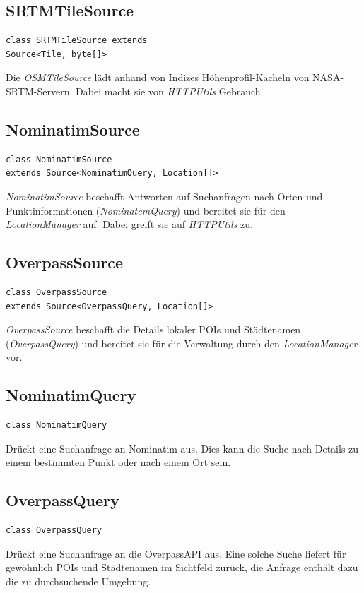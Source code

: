 \documentclass[10pt]{scrreprt}
\begin{document}
\subsection*{SRTMTileSource}
\begin{lstlisting}
class SRTMTileSource extends
Source<Tile, byte[]>
\end{lstlisting}
Die \textit{OSMTileSource} lädt anhand von Indizes Höhenprofil-Kacheln von NASA-SRTM-Servern. Dabei macht sie von \textit{HTTPUtils} Gebrauch.\\

\subsection*{NominatimSource}
\begin{lstlisting}
class NominatimSource
extends Source<NominatimQuery, Location[]>
\end{lstlisting}
\textit{NominatimSource} beschafft Antworten auf Suchanfragen nach Orten und Punktinformationen (\textit{NominatemQuery}) und bereitet sie für den \textit{LocationManager} auf. Dabei greift sie auf \textit{HTTPUtils} zu.\\

\subsection*{OverpassSource}
\begin{lstlisting}
class OverpassSource
extends Source<OverpassQuery, Location[]>
\end{lstlisting}
\textit{OverpassSource} beschafft die Details lokaler POIs und Städtenamen (\textit{OverpassQuery}) und bereitet sie für die Verwaltung durch den \textit{LocationManager} vor.\\

\subsection*{NominatimQuery}
\begin{lstlisting}
class NominatimQuery
\end{lstlisting}
Drückt eine Suchanfrage an Nominatim aus. Dies kann die Suche nach Details zu einem bestimmten Punkt oder nach einem Ort sein.\\

\subsection*{OverpassQuery}
\begin{lstlisting}
class OverpassQuery
\end{lstlisting}
Drückt eine Suchanfrage an die OverpassAPI aus. Eine solche Suche liefert für gewöhnlich POIs und Städtenamen im Sichtfeld zurück, die Anfrage enthält dazu die zu durchsuchende Umgebung.\\
\end{document}

